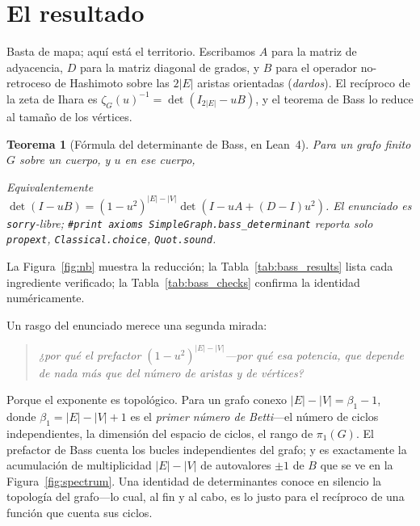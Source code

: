 \documentclass[11pt]{article}
\newtheorem{theorem}{Teorema}
\newcommand{\lean}[1]{\texttt{#1}}
\newcommand{\keyeq}[1]{\begin{center}\keybox{$\displaystyle #1$}\end{center}}
\begin{document}
\section{El resultado}
\label{sec:result}

Basta de mapa; aqu\'i est\'a el territorio. Escribamos $A$ para la matriz de adyacencia, $D$ para la
matriz diagonal de grados, y $B$ para el operador no-retroceso de Hashimoto sobre las $2|E|$ aristas
orientadas (\emph{dardos}). El rec\'iproco de la zeta de Ihara es
$\zeta_G(u)^{-1}=\det(I_{2|E|}-uB)$, y el teorema de Bass lo reduce al tama\~no de los v\'ertices.

\begin{theorem}[F\'ormula del determinante de Bass, en Lean~4]
\label{thm:bass}
Para un grafo finito $G$ sobre un cuerpo, y $u$ en ese cuerpo,
\keyeq{(1-u^2)^{|V|}\,\det\!\bigl(I-uB\bigr)\;=\;(1-u^2)^{|E|}\,\det\!\bigl(I-uA+u^2(D-I)\bigr).}
Equivalentemente $\det(I-uB)=(1-u^2)^{|E|-|V|}\det(I-uA+(D-I)u^2)$. El enunciado es \lean{sorry}-libre;
\lean{\#print axioms SimpleGraph.bass\_determinant} reporta solo \lean{propext},
\lean{Classical.choice}, \lean{Quot.sound}.
\end{theorem}

La Figura~\ref{fig:nb} muestra la reducci\'on; la Tabla~\ref{tab:bass_results} lista cada
ingrediente verificado; la Tabla~\ref{tab:bass_checks} confirma la identidad num\'ericamente.

Un rasgo del enunciado merece una segunda mirada:
\begin{quote}\itshape
  ¿por qu\'e el prefactor $(1-u^2)^{|E|-|V|}$---por qu\'e \emph{esa} potencia, que depende de nada
  m\'as que del n\'umero de aristas y de v\'ertices?
\end{quote}
Porque el exponente es topol\'ogico. Para un grafo conexo $|E|-|V|=\beta_1-1$, donde
$\beta_1=|E|-|V|+1$ es el \emph{primer n\'umero de Betti}---el n\'umero de ciclos independientes, la
dimensi\'on del espacio de ciclos, el rango de $\pi_1(G)$. El prefactor de Bass cuenta los bucles
independientes del grafo; y es exactamente la acumulaci\'on de multiplicidad $|E|-|V|$ de autovalores
$\pm1$ de $B$ que se ve en la Figura~\ref{fig:spectrum}. Una identidad de determinantes conoce en
silencio la topolog\'ia del grafo---lo cual, al fin y al cabo, es lo justo para el rec\'iproco de una
funci\'on que cuenta sus ciclos.
\end{document}
